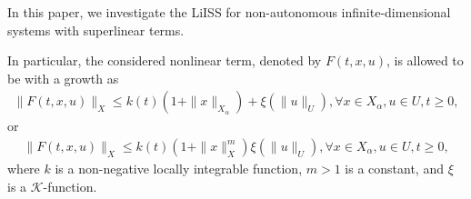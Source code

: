 \documentclass[onecolumn]{autart}
\newenvironment{proof of Prop.ODE}{{\it Proof of Proposition~\ref{Prop.ODE}:\enspace}}{\hfill $\blacksquare$\par}
\newenvironment{proof of PDE}{{\it Proof of Proposition \ref{Prop.8}:\enspace}}{\hfill $\blacksquare$\par}
\begin{document}

In this paper, we investigate the  LiISS   for   non-autonomous infinite-dimensional systems with superlinear  terms.  {In particular,    the considered nonlinear term, denoted by $F(t,x,u)$,  is allowed to be with a growth as
	\begin{align*}%
		\| F(t, x,u) \|_{{X}} \leq k (t)(1 + \| {x} \|_{ X _{\alpha}})+ \xi(\|u\|_U),\forall x\in X_{\alpha},u\in U,t\geq 0,
	\end{align*}
	or
	\begin{align*}%
		\| F(t, x,u) \|_{{X}} \leq k (t)\left(1+ \| {x} \|_{ X  }^m\right)   \xi(\|u\|_U),\forall x\in X_{\alpha},u\in U,t\geq 0,
	\end{align*}
	where    $k $ is a non-negative	locally integrable function, $m>1$ is a constant, and $\xi$ is a $\mathcal{K}$-function.
	
}
\end{document}
